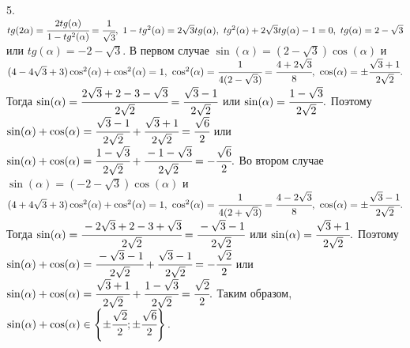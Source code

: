 5. $tg(2\alpha)=\cfrac{2tg(\alpha)}{1-tg^2(\alpha)}=\cfrac{1}{\sqrt{3}},\ 1-tg^2(\alpha)=2\sqrt{3}tg(\alpha),\ tg^2(\alpha)+2\sqrt{3}tg(\alpha)-1=0,\
tg(\alpha)=2-\sqrt{3}$ или $tg(\alpha)=-2-\sqrt{3}.$ В первом случае $\sin(\alpha)=(2-\sqrt{3})\cos(\alpha)$ и $(4-4\sqrt{3}+3)\cos^2(\alpha)+\cos^2(\alpha)=1,\
\cos^2(\alpha)=\cfrac{1}{4(2-\sqrt{3})}=\cfrac{4+2\sqrt{3}}{8},\ \cos(\alpha)=\pm\cfrac{\sqrt{3}+1}{2\sqrt{2}}.$ Тогда $\sin(\alpha)=\cfrac{2\sqrt{3}+2-3-\sqrt{3}}{2\sqrt{2}}=\cfrac{\sqrt{3}-1}{2\sqrt{2}}$ или $\sin(\alpha)=\cfrac{1-\sqrt{3}}{2\sqrt{2}}.$ Поэтому $\sin(\alpha)+\cos(\alpha)=\cfrac{\sqrt{3}-1}{2\sqrt{2}}+\cfrac{\sqrt{3}+1}{2\sqrt{2}}=\cfrac{\sqrt{6}}{2}$ или $\sin(\alpha)+\cos(\alpha)=\cfrac{1-\sqrt{3}}{2\sqrt{2}}+\cfrac{-1-\sqrt{3}}{2\sqrt{2}}=-\cfrac{\sqrt{6}}{2}.$ Во втором случае $\sin(\alpha)=(-2-\sqrt{3})\cos(\alpha)$ и $(4+4\sqrt{3}+3)\cos^2(\alpha)+\cos^2(\alpha)=1,\
\cos^2(\alpha)=\cfrac{1}{4(2+\sqrt{3})}=\cfrac{4-2\sqrt{3}}{8},\ \cos(\alpha)=\pm\cfrac{\sqrt{3}-1}{2\sqrt{2}}.$ Тогда $\sin(\alpha)=\cfrac{-2\sqrt{3}+2-3+\sqrt{3}}{2\sqrt{2}}=\cfrac{-\sqrt{3}-1}{2\sqrt{2}}$ или $\sin(\alpha)=\cfrac{\sqrt{3}+1}{2\sqrt{2}}.$ Поэтому $\sin(\alpha)+\cos(\alpha)=\cfrac{-\sqrt{3}-1}{2\sqrt{2}}+\cfrac{\sqrt{3}-1}{2\sqrt{2}}=-\cfrac{\sqrt{2}}{2}$ или $\sin(\alpha)+\cos(\alpha)=\cfrac{\sqrt{3}+1}{2\sqrt{2}}+\cfrac{1-\sqrt{3}}{2\sqrt{2}}=\cfrac{\sqrt{2}}{2}.$ Таким образом, $\sin(\alpha)+\cos(\alpha)\in\left\{\pm\cfrac{\sqrt{2}}{2};\pm\cfrac{\sqrt{6}}{2}\right\}.$\\
